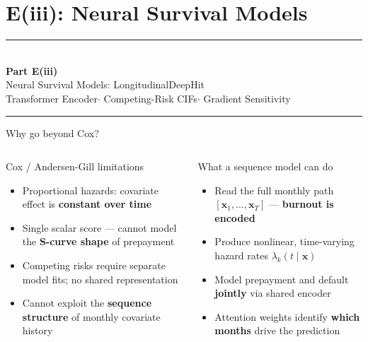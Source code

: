 \documentclass[10pt,aspectratio=169]{beamer}
\begin{document}
\section{E(iii): Neural Survival Models}

\begin{frame}
    \vfill
    \begin{center}
        {\color{accent}\rule{0.28\linewidth}{1.2pt}}\\[0.7em]
        {\Large\bfseries Part E(iii)}\\[0.5em]
        {\large Neural Survival Models: LongitudinalDeepHit}\\[0.4em]
        {\small Transformer Encoder\enspace$\cdot$\enspace
                Competing-Risk CIFs\enspace$\cdot$\enspace
                Gradient Sensitivity}\\[0.7em]
        {\color{accent}\rule{0.28\linewidth}{1.2pt}}
    \end{center}
    \vfill
\end{frame}

\begin{frame}{Why go beyond Cox?}
    \begin{columns}[T,onlytextwidth]
        \begin{block}{Cox / Andersen-Gill limitations}
        \small
        \begin{itemize}\itemsep4pt
            \item Proportional hazards: covariate effect is \textbf{constant over time}
            \item Single scalar score --- cannot model the \textbf{S-curve shape} of prepayment
            \item Competing risks require separate model fits; no shared representation
            \item Cannot exploit the \textbf{sequence structure} of monthly covariate history
        \end{itemize}
        \end{block}

        \begin{block}{What a sequence model can do}
        \small
        \begin{itemize}\itemsep4pt
            \item Read the full monthly path $[\mathbf{x}_1, \dots, \mathbf{x}_T]$ --- \textbf{burnout is encoded}
            \item Produce nonlinear, time-varying hazard rates $\lambda_k(t \mid \mathbf{x})$
            \item Model prepayment and default \textbf{jointly} via shared encoder
            \item Attention weights identify \textbf{which months} drive the prediction
        \end{itemize}
        \end{block}
    \end{columns}
\end{frame}
\end{document}
